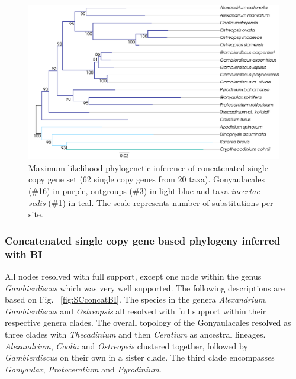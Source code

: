 \documentclass[12pt]{article}
\begin{document}
\begin{figure} 
\includegraphics[scale=.45]{figures/Singlecopy-concat-ML.png} 
\caption{Maximum likelihood phylogenetic inference of concatenated single copy gene set (62 single copy genes from 20 taxa). Gonyaulacales (\#16) in purple, outgroups (\#3) in light blue and taxa \textit{incertae sedis} (\#1) in teal. The scale represents number of substitutions per site.} 
\label{fig:SCconcatML}
\end{figure} 
\FloatBarrier

\subsubsection*{Concatenated single copy gene based phylogeny inferred with BI}
\FloatBarrier 
All nodes resolved with full support, except one node within the genus \textit{Gambierdiscus} which was very well supported. 
The following descriptions are based on Fig. ~\ref{fig:SCconcatBI}. 
The species in the genera \textit{Alexandrium}, \textit{Gambierdiscus} and \textit{Ostreopsis} all resolved with full support within their respective genera clades. 
The overall topology of the Gonyaulacales resolved as three clades with \textit{Thecadinium} and then \textit{Ceratium} as ancestral lineages. 
\textit{Alexandrium}, \textit{Coolia} and \textit{Ostreopsis} clustered together, followed by \textit{Gambierdiscus} on their own in a sister clade. 
The third clade encompasses \textit{Gonyaulax}, \textit{Protoceratium} and \textit{Pyrodinium}. 
\end{document}
